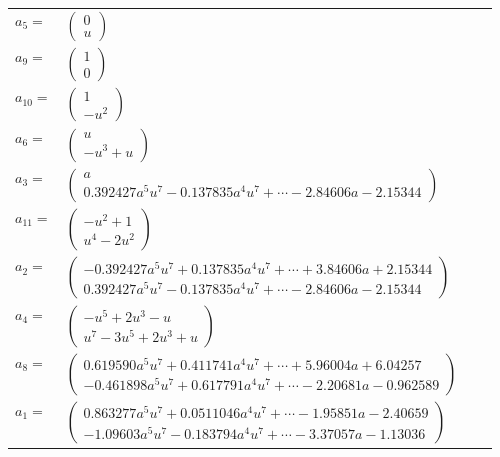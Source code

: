 \documentclass[1p]{elsarticle_modified}
\theoremstyle{definition}
\begin{document}
\begin{tabular}{m{7pt} m{180pt} m{7pt} m{180pt} }
\flushright $a_{5}=$&$\begin{pmatrix}0\\u\end{pmatrix}$ \\
\flushright $a_{9}=$&$\begin{pmatrix}1\\0\end{pmatrix}$ \\
\flushright $a_{10}=$&$\begin{pmatrix}1\\- u^2\end{pmatrix}$ \\
\flushright $a_{6}=$&$\begin{pmatrix}u\\- u^3+u\end{pmatrix}$ \\
\flushright $a_{3}=$&$\begin{pmatrix}a\\0.392427 a^{5} u^{7}-0.137835 a^{4} u^{7}+\cdots-2.84606 a-2.15344\end{pmatrix}$ \\
\flushright $a_{11}=$&$\begin{pmatrix}- u^2+1\\u^4-2 u^2\end{pmatrix}$ \\
\flushright $a_{2}=$&$\begin{pmatrix}-0.392427 a^{5} u^{7}+0.137835 a^{4} u^{7}+\cdots+3.84606 a+2.15344\\0.392427 a^{5} u^{7}-0.137835 a^{4} u^{7}+\cdots-2.84606 a-2.15344\end{pmatrix}$ \\
\flushright $a_{4}=$&$\begin{pmatrix}- u^5+2 u^3- u\\u^7-3 u^5+2 u^3+u\end{pmatrix}$ \\
\flushright $a_{8}=$&$\begin{pmatrix}0.619590 a^{5} u^{7}+0.411741 a^{4} u^{7}+\cdots+5.96004 a+6.04257\\-0.461898 a^{5} u^{7}+0.617791 a^{4} u^{7}+\cdots-2.20681 a-0.962589\end{pmatrix}$ \\
\flushright $a_{1}=$&$\begin{pmatrix}0.863277 a^{5} u^{7}+0.0511046 a^{4} u^{7}+\cdots-1.95851 a-2.40659\\-1.09603 a^{5} u^{7}-0.183794 a^{4} u^{7}+\cdots-3.37057 a-1.13036\end{pmatrix}$ \\

\end{tabular}
\end{document}

